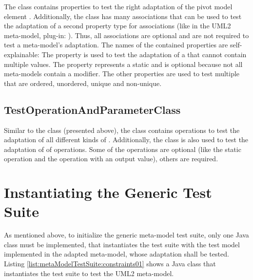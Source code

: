 The class  contains properties to test the right adaptation of the pivot model element . Additionally, the class has many associations that can be used to test the adaptation of a second property type for associations (like in the \acs{UML}2 meta-model, plug-in: ). Thus, all associations are optional and are not required to test a meta-model's adaptation. The names of the contained properties are self-explainable: The property  is used to test the adaptation of a  that cannot contain multiple values. The property  represents a static  and is optional because not all meta-models contain a  modifier. The other properties are used to test multiple  that are ordered, unordered, unique and non-unique.


\subsection{TestOperationAndParameterClass}

Similar to the class  (presented above), the class  contains operations to test the adaptation of all different kinds of . Additionally, the class is also used to test the adaptation of  of operations. Some of the operations are optional (like the static operation and the operation with an output value), others are required.


\section{Instantiating the Generic Test Suite}

As mentioned above, to initialize the generic meta-model test suite, only one Java class must be implemented, that instantiates the test suite with the test model implemented in the adapted meta-model, whose adaptation shall be tested. Listing \ref{list:metaModelTestSuite:constraints01} shows a Java class that instantiates the test suite to test the \acs{UML}2 meta-model.

